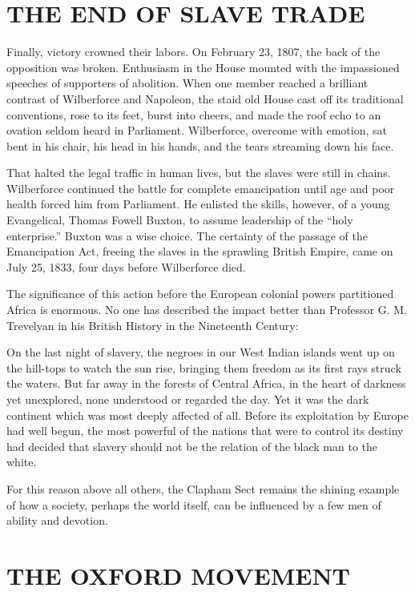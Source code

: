 \section{THE END OF SLAVE TRADE}

Finally, victory crowned their labors. On February 23, 1807, the back of the opposition was broken.
Enthusiasm in the House mounted with the impassioned speeches of supporters of abolition. When one
member reached a brilliant contrast of Wilberforce and Napoleon, the staid old House cast off its
traditional conventions, rose to its feet, burst into cheers, and made the roof echo to an ovation
seldom heard in Parliament. Wilberforce, overcome with emotion, sat bent in his chair, his head in
his hands, and the tears streaming down his face.

That halted the legal traffic in human lives, but the slaves were still in chains. Wilberforce
continued the battle for complete emancipation until age and poor health forced him from Parliament.
He enlisted the skills, however, of a young Evangelical, Thomas Fowell Buxton, to assume leadership
of the “holy enterprise.” Buxton was a wise choice. The certainty of the passage of the Emancipation
Act, freeing the slaves in the sprawling British Empire, came on July 25, 1833, four days before
Wilberforce died.

The significance of this action before the European colonial powers partitioned Africa is enormous.
No one has described the impact better than Professor G. M. Trevelyan in his British History in the
Nineteenth Century:

\begin{blockquote}
On the last night of slavery, the negroes in our West Indian islands went up on the hill-tops to
watch the sun rise, bringing them freedom as its first rays struck the waters. But far away in the
forests of Central Africa, in the heart of darkness yet unexplored, none understood or regarded the
day. Yet it was the dark continent which was most deeply affected of all. Before its exploitation by
Europe had well begun, the most powerful of the nations that were to control its destiny had decided
that slavery should not be the relation of the black man to the white.
\end{blockquote}

For this reason above all others, the Clapham Sect remains the shining example of how a society,
perhaps the world itself, can be influenced by a few men of ability and devotion.

\section{THE OXFORD MOVEMENT}

